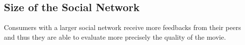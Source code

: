 \subsection{Size of the Social Network}
\label{sub:size_of_the_social_network}

Consumers with a larger social network receive more feedbacks from their peers and thus they are able to evaluate more precisely the quality of the movie.

